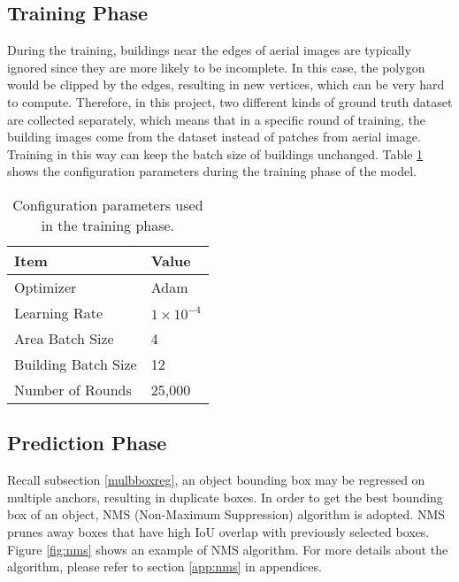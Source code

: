\subsection{Training Phase}\label{trnphs}
During the training, buildings near the edges of aerial images are typically ignored since they are more likely to be incomplete. In this case, the polygon would be clipped by the edges, resulting in new vertices, which can be very hard to compute. Therefore, in this project, two different kinds of ground truth dataset are collected separately, which means that in a specific round of training, the building images come from the dataset instead of patches from aerial image. Training in this way can keep the batch size of buildings unchanged. Table \ref{tab:trnphs} shows the configuration parameters during the training phase of the model.

\begin{table}[!h]
	\centering
	\caption[Configuration parameters used in the training phase]{Configuration parameters used in the training phase.}
	\label{tab:trnphs}
	\begin{tabular}{l|l}
	\hline
	\textbf{Item} & \textbf{Value} \\
	\hline
	Optimizer & Adam \\
	Learning Rate & $1\times10^{-4}$ \\
	Area Batch Size & 4 \\
	Building Batch Size & 12 \\
	Number of Rounds & 25,000 \\
	\hline
	\end{tabular}
\end{table}

\subsection{Prediction Phase}\label{prdphs}
Recall subsection \ref{mulbboxreg}, an object bounding box may be regressed on multiple anchors, resulting in duplicate boxes. In order to get the best bounding box of an object, NMS (Non-Maximum Suppression) algorithm is adopted. NMS prunes away boxes that have high IoU overlap with previously selected boxes. Figure \ref{fig:nms} shows an example of NMS algorithm. For more details about the algorithm, please refer to section \ref{app:nms} in appendices.

